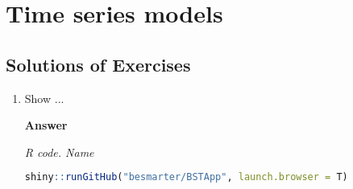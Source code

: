 \chapter{Time series models}\label{chap8}

\section{Solutions of Exercises}\label{sec81}
\begin{enumerate}[leftmargin=*]

	\item Show ...
	
	\textbf{Answer}
	
	\begin{tcolorbox}[enhanced,width=4.67in,center upper,
		fontupper=\large\bfseries,drop shadow southwest,sharp corners]
		\textit{R code. Name}
		\begin{VF}
			\begin{lstlisting}[language=R]
	shiny::runGitHub("besmarter/BSTApp", launch.browser = T)\end{lstlisting}
		\end{VF}
	\end{tcolorbox} 
	
\end{enumerate}